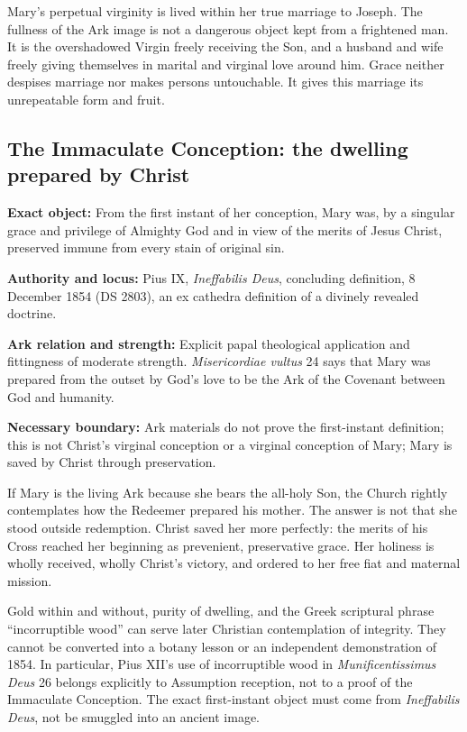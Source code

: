 Mary's perpetual virginity is lived within her true marriage to Joseph.  The
fullness of the Ark image is not a dangerous object kept from a frightened
man.  It is the overshadowed Virgin freely receiving the Son, and a husband
and wife freely giving themselves in marital and virginal love around him.
Grace neither despises marriage nor makes persons untouchable.  It gives this
marriage its unrepeatable form and fruit.

\subsection{The Immaculate Conception: the dwelling prepared by Christ}

\begin{studyframe}
\textbf{Exact object:} From the first instant of her conception, Mary was, by
a singular grace and privilege of Almighty God and in view of the merits of
Jesus Christ, preserved immune from every stain of original sin.\par
\textbf{Authority and locus:} Pius IX, \emph{Ineffabilis Deus}, concluding
definition, 8 December 1854 (DS 2803), an ex cathedra definition of a divinely
revealed doctrine.\par
\textbf{Ark relation and strength:} Explicit papal theological application
and fittingness of moderate strength.  \emph{Misericordiae vultus} 24 says
that Mary was prepared from the outset by God's love to be the Ark of the
Covenant between God and humanity.\par
\textbf{Necessary boundary:} Ark materials do not prove the first-instant
definition; this is not Christ's virginal conception or a virginal conception
of Mary; Mary is saved by Christ through preservation.
\end{studyframe}

If Mary is the living Ark because she bears the all-holy Son, the Church
rightly contemplates how the Redeemer prepared his mother.  The answer is not
that she stood outside redemption.  Christ saved her more perfectly: the
merits of his Cross reached her beginning as prevenient, preservative grace.
Her holiness is wholly received, wholly Christ's victory, and ordered to her
free fiat and maternal mission.

Gold within and without, purity of dwelling, and the Greek scriptural phrase
``incorruptible wood'' can serve later Christian contemplation of integrity.
They cannot be converted into a botany lesson or an independent demonstration
of 1854.  In particular, Pius XII's use of incorruptible wood in
\emph{Munificentissimus Deus} 26 belongs explicitly to Assumption reception,
not to a proof of the Immaculate Conception.  The exact first-instant object
must come from \emph{Ineffabilis Deus}, not be smuggled into an ancient image.

